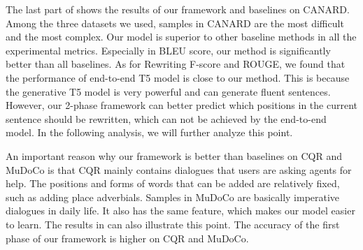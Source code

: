 The last part of  shows the results of our framework and baselines on CANARD. Among the three datasets we used, samples in CANARD are the most difficult and the most complex. 
Our model is superior to other baseline methods
in all the experimental metrics. 
Especially in BLEU score, 
our method is significantly 
better 
than all baselines. 
As for Rewriting F-score and ROUGE, we found that the
performance of 
 end-to-end T5 model is close to 
our method. 
This is because the generative T5 model is very powerful and can generate fluent sentences. However, our 2-phase framework can better predict which positions in the current sentence should be rewritten, which
can not be achieved by the end-to-end model.
In the following analysis, we will further analyze this point.



An important reason why our framework is better than baselines on CQR and MuDoCo is that CQR mainly contains dialogues that users are asking agents for help. The positions and forms of words that can be added are relatively fixed, such as adding place adverbials. Samples in MuDoCo are basically imperative dialogues in daily life. It also has the same feature, which makes our model easier to learn.
The results in  can also illustrate this point. The accuracy of the first phase of our framework is higher on CQR and MuDoCo.







